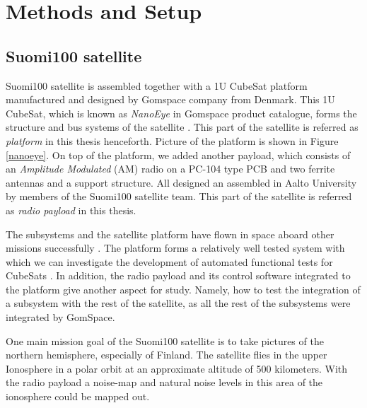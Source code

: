 \documentclass[english,12pt,a4paper,pdftex,elec,utf8]{aaltothesis}
\begin{document}
\clearpage

\section{Methods and Setup}
\subsection{Suomi100 satellite}
Suomi100 satellite is assembled together with a 1U CubeSat platform manufactured and designed by Gomspace company from Denmark. This 1U CubeSat, which is known as \textit{NanoEye} in Gomspace product catalogue, forms the structure and bus systems of the satellite \cite{gomspaceweb}. This part of the satellite is referred as \textit{platform} in this thesis henceforth. Picture of the platform is shown in Figure \ref{nanoeye}. On top of the platform, we added another payload, which consists of an \textit{Amplitude Modulated} (AM) radio on a PC-104 type PCB and two ferrite antennas and a support structure. All designed an assembled in Aalto University by members of the Suomi100 satellite team. This part of the satellite is referred as \textit{radio payload} in this thesis.\par
The subsystems and the satellite platform have flown in space aboard other missions successfully \cite{nasasmallsatstate}. The platform forms a relatively well tested system with which we can investigate the development of automated functional tests for CubeSats \cite{nasasmallsatstate}. In addition, the radio payload and its control software integrated to the platform give another aspect for study. Namely, how to test the integration of a subsystem with the rest of the satellite, as all the rest of the subsystems were integrated by GomSpace.\par
One main mission goal of the Suomi100 satellite is to take pictures of the northern hemisphere, especially of Finland. The satellite flies in the upper Ionosphere in a polar orbit at an approximate altitude of 500 kilometers. With the radio payload a noise-map and natural noise levels in this area of the ionosphere could be mapped out. 
\end{document}
